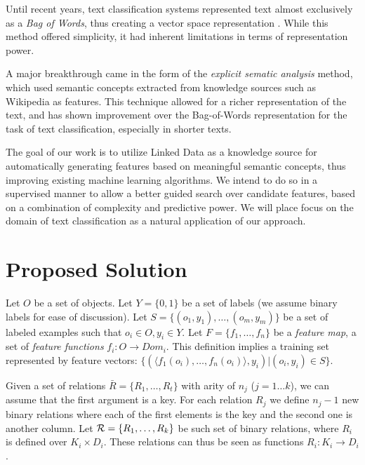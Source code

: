 \documentclass{article}
\theoremstyle{definition}
\begin{document}
Until recent years, text classification systems represented text almost exclusively as a \emph{Bag of Words}, thus creating a vector space representation \citep{Wu:1981:CST:1013228.511759, salton1983introduction}. While this method offered simplicity, it had inherent limitations in terms of representation power.

A major breakthrough came in the form of the \emph{explicit sematic analysis} \citep{gabrilovich2006overcoming} method, which used semantic concepts extracted from knowledge sources such as Wikipedia as features. This technique allowed for a richer representation of the text, and has shown improvement over the Bag-of-Words representation for the task of text classification, especially in shorter texts.

The goal of our work is to utilize Linked Data as a knowledge source for automatically generating features based on meaningful semantic concepts, thus improving existing machine learning algorithms. We intend to do so in a supervised manner to allow a better guided search over candidate features, based on a combination of complexity and predictive power. We will place focus on the domain of text classification as a natural application of our approach.

\section{Proposed Solution}

Let $O$ be a set of objects. Let $Y=\{0,1\}$ be a set of labels (we assume binary labels for ease of discussion). Let $S=\{(o_{1},y_{1}),\ldots,(o_{m},y_{m})\}$ be a set of labeled examples such that $o_{i}\in O, y_{i}\in Y$. Let $F=\{f_{1},\ldots,f_{n}\}$ be a \emph{feature map}, a set of \emph{feature functions} $f_{i}:O\rightarrow Dom_{i}$.  This definition implies a training set represented by feature vectors: $\{ (\langle f_1(o_i),\ldots,f_n(o_i)\rangle, y_i) | (o_i,y_i) \in S\}$.

Given a set of relations $\bar{R}=\{R_{1},\ldots,R_{t}\}$ with arity of $n_{j}$ ($j=1\ldots k$), we can assume  that the first argument is a key. For each relation $R_{j}$ we define $n_{j}-1$ new binary relations where each of the first elements is the key and the second one is another column.
Let ${\cal R}=\{R_{1},\ldots,R_{k}\}$ be such set of binary relations, where $R_{i}$ is defined over $K_{i}\times D_{i}$. These relations can thus be seen as functions $R_{i}: K_{i}\rightarrow D_{i}$.
\end{document}
